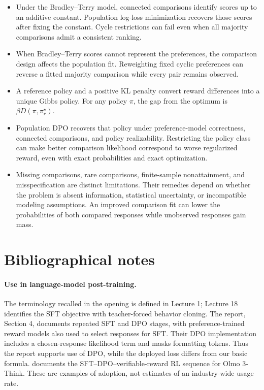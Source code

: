 \documentclass[11pt,twoside]{article}
\newcommand{\KL}{D}
\theoremstyle{definition}
\theoremstyle{remark}
\begin{document}
\begin{itemize}[leftmargin=*]
\item Under the Bradley--Terry model, connected comparisons identify scores
up to an additive constant. Population log-loss minimization recovers those
scores after fixing the constant. Cycle restrictions can fail even when all
majority comparisons admit a consistent ranking.
\item When Bradley--Terry scores cannot represent the preferences, the comparison
design affects the population fit. Reweighting fixed cyclic preferences can reverse a
fitted majority comparison while every pair remains observed.
\item A reference policy and a positive KL penalty convert reward differences
into a unique Gibbs policy. For any policy $\pi$, the gap from the optimum is
$\beta\KL(\pi,\pi_r^\star)$.
\item Population DPO recovers that policy under preference-model correctness,
connected comparisons, and policy realizability. Restricting the policy
class can make better comparison likelihood correspond to worse regularized
reward, even with exact probabilities and exact optimization.
\item Missing comparisons, rare comparisons, finite-sample nonattainment,
and misspecification are distinct limitations. Their remedies depend on
whether the problem is absent information, statistical uncertainty, or
incompatible modeling assumptions.
An improved comparison fit can lower the probabilities of both compared
responses while unobserved responses gain mass.
\end{itemize}

\printendnotes

\section*{Bibliographical notes}
\label{sec:bibliographical-notes}

\paragraph{Use in language-model post-training.}
The terminology recalled in the opening is defined in Lecture 1;
Lecture 18 identifies the SFT objective with teacher-forced behavior cloning.
The \citet{llama2024} report, Section 4, documents repeated SFT and DPO
stages, with preference-trained reward models also used to select responses
for SFT. Their DPO implementation includes a chosen-response likelihood
term and masks formatting tokens. Thus the report supports use of DPO,
while the deployed loss differs from our basic formula.
\citet{ai2olmo2025} documents the SFT--DPO--verifiable-reward RL sequence
for Olmo 3-Think. These are examples of adoption, not estimates of an
industry-wide usage rate.
\end{document}
